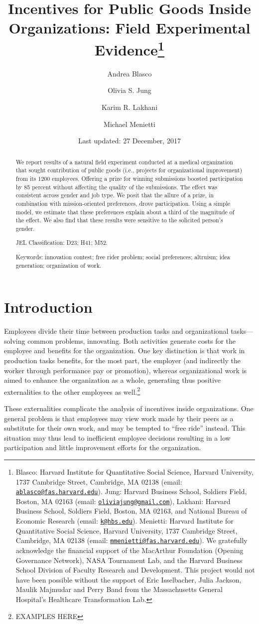 \documentclass[12pt, titlepage]{article}
\title{Incentives for Public Goods Inside Organizations: Field Experimental
Evidence\thanks{Blasco: Harvard Institute for Quantitative Social Science, Harvard
University, 1737 Cambridge Street, Cambridge, MA 02138 (email:
\href{mailto:ablasco@fas.harvard.edu}{\nolinkurl{ablasco@fas.harvard.edu}}).
Jung: Harvard Business School, Soldiers Field, Boston, MA 02163 (email:
\href{mailto:oliviajung@gmail.com}{\nolinkurl{oliviajung@gmail.com}}),
Lakhani: Harvard Business School, Soldiers Field, Boston, MA 02163, and
National Bureau of Economic Research (email:
\href{mailto:k@hbs.edu}{\nolinkurl{k@hbs.edu}}). Menietti: Harvard
Institute for Quantitative Social Science, Harvard University, 1737
Cambridge Street, Cambridge, MA 02138 (email:
\href{mailto:mmenietti@fas.harvard.edu}{\nolinkurl{mmenietti@fas.harvard.edu}}).
We gratefully acknowledge the financial support of the MacArthur
Foundation (Opening Governance Network), NASA Tournament Lab, and the
Harvard Business School Division of Faculty Research and Development.
This project would not have been possible without the support of Eric
Isselbacher, Julia Jackson, Maulik Majmudar and Perry Band from the
Massachusetts General Hospital's Healthcare Transformation Lab.}}
\author{Andrea Blasco \and Olivia S. Jung \and Karim R. Lakhani \and Michael Menietti}
\date{Last updated: 27 December, 2017}
\begin{document}
\maketitle
\begin{abstract}
We report results of a natural field experiment conducted at a medical
organization that sought contribution of public goods (i.e., projects
for organizational improvement) from its 1200 employees. Offering a
prize for winning submissions boosted participation by 85 percent
without affecting the quality of the submissions. The effect was
consistent across gender and job type. We posit that the allure of a
prize, in combination with mission-oriented preferences, drove
participation. Using a simple model, we estimate that these preferences
explain about a third of the magnitude of the effect. We also find that
these results were sensitive to the solicited person's gender.

\smallskip\noindent 
JEL Classification: D23; H41; M52.

\smallskip\noindent 
Keywords: innovation contest; free rider problem; social preferences; altruism; idea generation; organization of work.
\end{abstract}


\clearpage
\tableofcontents
\setcounter{tocdepth}{2}
\clearpage

\section{Introduction}\label{introduction}

Employees divide their time between production tasks and organizational
tasks---solving common problems, innovating. Both activities generate
costs for the employee and benefits for the organization. One key
distinction is that work in production tasks benefits, for the most
part, the employer (and indirectly the worker through performance pay or
promotion), whereas organizational work is aimed to enhance the
organization as a whole, generating thus positive externalities to the
other employees as well.\footnote{EXAMPLES HERE}

These externalities complicate the analysis of incentives inside
organizations. One general problem is that employees may view work made
by their peers as a substitute for their own work, and may be tempted to
``free ride'' instead. This situation may thus lead to inefficient
employee decisions resulting in a low participation and little
improvement efforts for the organization.
\end{document}
